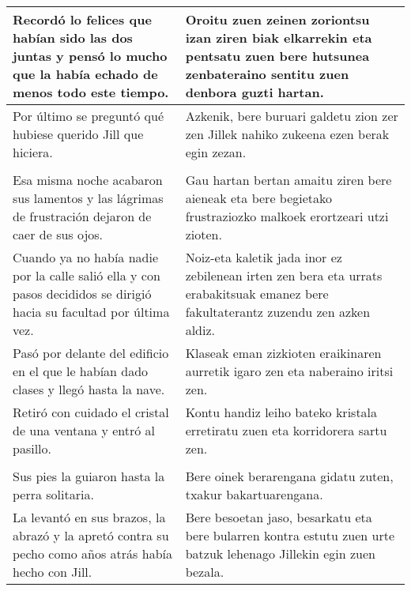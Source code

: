 \documentclass{article}
\begin{document}
\begin{center}
\begin{longtable}{|p{6cm}|p{6cm}|}
  \midrule
  Recordó lo felices que habían sido las dos juntas y pensó lo mucho que la había echado de menos todo este tiempo.&
  Oroitu zuen zeinen zoriontsu izan ziren biak elkarrekin eta pentsatu zuen bere hutsunea zenbateraino sentitu zuen denbora guzti hartan.\\

  \midrule
  Por último se preguntó qué hubiese querido Jill que hiciera.&
  Azkenik, bere buruari galdetu zion zer zen Jillek nahiko zukeena ezen berak egin zezan.\\

  \midrule
  \cellcolor{lightgray}{\textbf{Párrafo}} &
  \cellcolor{lightgray}{\textbf{Paragrafoa}}\\
  
  \midrule
  Esa misma noche acabaron sus lamentos y las lágrimas de frustración dejaron de caer de sus ojos.&
  Gau hartan bertan amaitu ziren bere aieneak eta bere begietako frustraziozko malkoek erortzeari utzi zioten.\\

  \midrule
  Cuando ya no había nadie por la calle salió ella y con pasos decididos se dirigió hacia su facultad por última vez.&
  Noiz-eta kaletik jada inor ez zebilenean irten zen bera eta urrats erabakitsuak emanez bere fakultaterantz zuzendu zen azken aldiz.\\

  \midrule
  Pasó por delante del edificio en el que le habían dado clases y llegó hasta la nave.&
  Klaseak eman zizkioten eraikinaren aurretik igaro zen eta naberaino iritsi zen.\\

  \midrule
  Retiró con cuidado el cristal de una ventana y entró al pasillo.&
  Kontu handiz leiho bateko kristala erretiratu zuen eta korridorera sartu zen.\\

  \midrule
  \cellcolor{lightgray}{\textbf{Párrafo}} &
  \cellcolor{lightgray}{\textbf{Paragrafoa}}\\
  
  \midrule
  Sus pies la guiaron hasta la perra solitaria.&
  Bere oinek berarengana gidatu zuten, txakur bakartuarengana.\\

  \midrule
  La levantó en sus brazos, la abrazó y la apretó contra su pecho como años atrás había hecho con Jill.&
  Bere besoetan jaso, besarkatu eta bere bularren kontra estutu zuen urte batzuk lehenago Jillekin egin zuen bezala.\\


\end{longtable}
\end{center}
\end{document}
